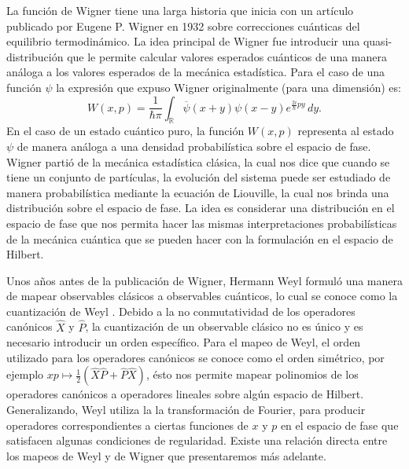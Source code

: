 \documentclass[a4paper]{report}
\DeclareMathOperator{\R}{\mathbb{R}}
\begin{document}
  La función de Wigner tiene una larga historia que inicia
  con un artículo publicado por Eugene P. Wigner en 1932
  \cite{wigner1932} sobre correcciones cuánticas del
  equilibrio termodinámico. La idea principal de Wigner fue
  introducir una quasi-distribución que le permite calcular
  valores esperados cuánticos de una manera análoga a los
  valores esperados de la mecánica estadística. Para el caso
  de una función $\psi$ la expresión que expuso Wigner
  originalmente (para una dimensión) es:
  \begin{equation}
    \label{eqn:wigners_original}
    W(x,p)
    = \frac{1}{\hbar \pi} \int_{\R}
    \overline{\psi}(x+y)\psi(x-y) e^{\frac{2i}{\hbar}py} \,
    dy.
  \end{equation}
  En el caso de un estado cuántico puro, la función $W(x,p)$
  representa al estado $\psi$ de manera análoga a una
  densidad probabilística sobre el espacio de fase. Wigner
  partió de la mecánica estadística clásica, la cual nos
  dice que cuando se tiene un conjunto de partículas, la
  evolución del sistema puede ser estudiado de manera
  probabilística mediante la ecuación de Liouville, la cual
  nos brinda una distribución sobre el espacio de fase.
  La idea es considerar una distribución en el espacio de
  fase que nos permita hacer las mismas interpretaciones
  probabilísticas de la mecánica cuántica que se pueden
  hacer con la formulación en el espacio de Hilbert.

  Unos años antes de la publicación de Wigner, Hermann Weyl
  formuló una manera de mapear observables clásicos a
  observables cuánticos, lo cual se conoce como la
  cuantización de Weyl \cite{degosson2021}. Debido a la no
  conmutatividad de los operadores canónicos $\hat X$ y
  $\hat P$, la cuantización de un observable clásico no es
  único y es necesario introducir un orden específico. Para
  el mapeo de Weyl, el orden utilizado para los operadores
  canónicos se conoce como el orden simétrico, por ejemplo
  $xp \mapsto \frac{1}{2}\left( \hat{X} \hat{P} + \hat{P}
  \hat{X} \right)$, ésto nos permite mapear polinomios de
  los operadores canónicos a operadores lineales sobre algún
  espacio de Hilbert. Generalizando, Weyl utiliza la la
  transformación de Fourier, para producir operadores
  correspondientes a ciertas funciones de $x$ y $p$ en el
  espacio de fase que satisfacen algunas condiciones de
  regularidad. Existe una relación directa entre los mapeos
  de Weyl y de Wigner que presentaremos más adelante. 
\end{document}
